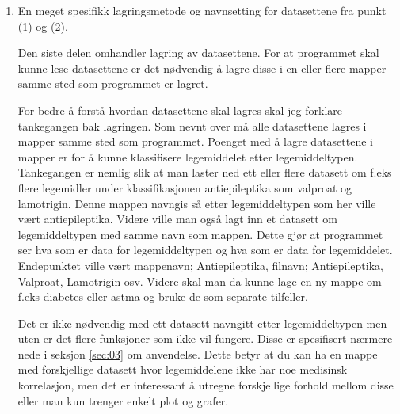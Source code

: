 \documentclass[12pt,norsk,a4paper,fleqn]{article}
\numberwithin{equation}{section}
\begin{document}
\begin{enumerate}
Angående punkt to om befolkningsdata anbefaler jeg på det sterkest å bruke de dataene fra reseptregisteret under \textit{Måltall} med navn ''Befolkningsgrunnlag'' istedenfor fra SSB. Ved nedlasting fra reseptregisteret velges de parameterne som datasettet/datasettene du har nedlastet tidligere bruker. Det er her \textbf{NØDVENDIG} å spesifisere et legemiddel men hvilket har ingen betydning\footnote{Grunnen til dette er at programmet leser av spesifikke kolonner i csv-filen og uten et spesifisert legemiddel blir kolonnekombinasjonen forskjøvet en kolonne til venstre. Dette gjør at avlesningen ikke fungerer... Min feil ops.}

\textbf{En veldig viktig kommentar er at datasettet om befolkningen MÅ lagres med navnet 'Befolkning'.}

\item En meget spesifikk lagringsmetode og navnsetting for datasettene fra punkt (1) og (2).

Den siste delen omhandler lagring av datasettene. For at programmet skal kunne lese datasettene er det nødvendig å lagre disse i en eller flere mapper samme sted som programmet er lagret.

For bedre å forstå hvordan datasettene skal lagres skal jeg forklare tankegangen bak lagringen. Som nevnt over må alle datasettene lagres i mapper samme sted som programmet. Poenget med å lagre datasettene i mapper er for å kunne klassifisere legemiddelet etter legemiddeltypen. Tankegangen er nemlig slik at man laster ned ett eller flere datasett om f.eks flere legemidler under klassifikasjonen antiepileptika som valproat og lamotrigin. Denne mappen navngis så etter legemiddeltypen som her ville vært antiepileptika. Videre ville man også lagt inn et datasett om legemiddeltypen med samme navn som mappen. Dette gjør at programmet ser hva som er data for legemiddeltypen og hva som er data for legemiddelet. Endepunktet ville vært mappenavn; Antiepileptika, filnavn; Antiepileptika, Valproat, Lamotrigin osv. Videre skal man da kunne lage en ny mappe om f.eks diabetes eller astma og bruke de som separate tilfeller.

Det er ikke nødvendig med ett datasett navngitt etter legemiddeltypen men uten er det flere funksjoner som ikke vil fungere. Disse er spesifisert nærmere nede i seksjon \ref{sec:03} om anvendelse. Dette betyr at du kan ha en mappe med forskjellige datasett hvor legemiddelene ikke har noe medisinsk korrelasjon, men det er interessant å utregne forskjellige forhold mellom disse eller man kun trenger enkelt plot og grafer.

\end{enumerate}
\end{document}

